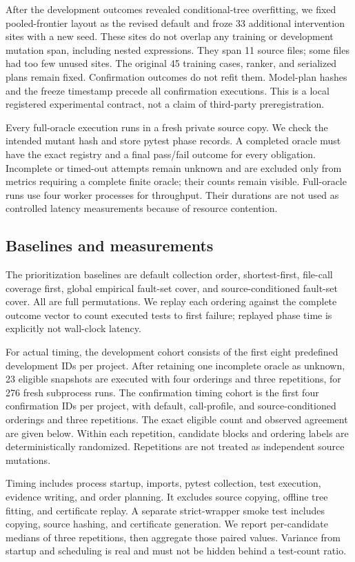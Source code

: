 After the development outcomes revealed conditional-tree overfitting, we fixed pooled-frontier layout as the revised default and froze 33 additional intervention sites with a new seed. These sites do not overlap any training or development mutation span, including nested expressions. They span 11 source files; some files had too few unused sites. The original 45 training cases, ranker, and serialized plans remain fixed. Confirmation outcomes do not refit them. Model-plan hashes and the freeze timestamp precede all confirmation executions. This is a local registered experimental contract, not a claim of third-party preregistration.

Every full-oracle execution runs in a fresh private source copy. We check the intended mutant hash and store pytest phase records. A completed oracle must have the exact registry and a final pass/fail outcome for every obligation. Incomplete or timed-out attempts remain unknown and are excluded only from metrics requiring a complete finite oracle; their counts remain visible. Full-oracle runs use four worker processes for throughput. Their durations are not used as controlled latency measurements because of resource contention.

\subsection{Baselines and measurements}
The prioritization baselines are default collection order, shortest-first, file-call coverage first, global empirical fault-set cover, and source-conditioned fault-set cover. All are full permutations. We replay each ordering against the complete outcome vector to count executed tests to first failure; replayed phase time is explicitly not wall-clock latency.

For actual timing, the development cohort consists of the first eight predefined development IDs per project. After retaining one incomplete oracle as unknown, 23 eligible snapshots are executed with four orderings and three repetitions, for 276 fresh subprocess runs. The confirmation timing cohort is the first four confirmation IDs per project, with default, call-profile, and source-conditioned orderings and three repetitions. The exact eligible count and observed agreement are given below. Within each repetition, candidate blocks and ordering labels are deterministically randomized. Repetitions are not treated as independent source mutations.

Timing includes process startup, imports, pytest collection, test execution, evidence writing, and order planning. It excludes source copying, offline tree fitting, and certificate replay. A separate strict-wrapper smoke test includes copying, source hashing, and certificate generation. We report per-candidate medians of three repetitions, then aggregate those paired values. Variance from startup and scheduling is real and must not be hidden behind a test-count ratio.

